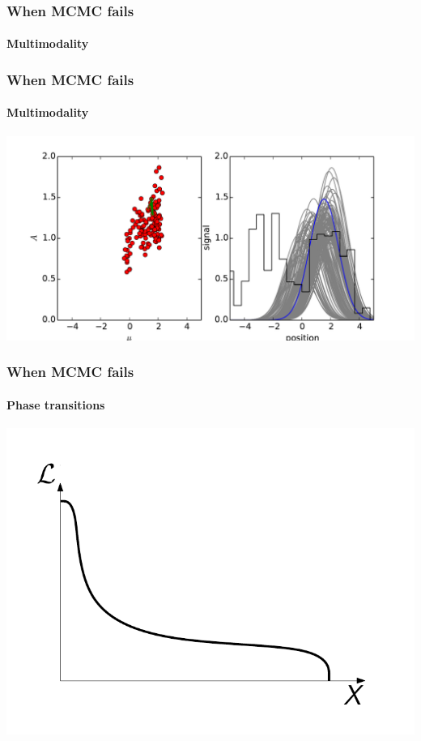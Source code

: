 \documentclass[]{beamer}
\begin{document}
\begin{frame}
  \frametitle{When MCMC fails} 
  \framesubtitle{Multimodality} 
\end{frame}
\begin{frame}
  \frametitle{When MCMC fails} 
  \framesubtitle{Multimodality} 
  \includegraphics[width=\textwidth]{movies/MCMC_multimodal_1.pdf}
\end{frame}

\begin{frame}
  \frametitle{When MCMC fails} 
  \framesubtitle{Phase transitions} 

  \includegraphics[width=\textwidth]{figures/phase_transition}
 
\end{frame}
\end{document}
